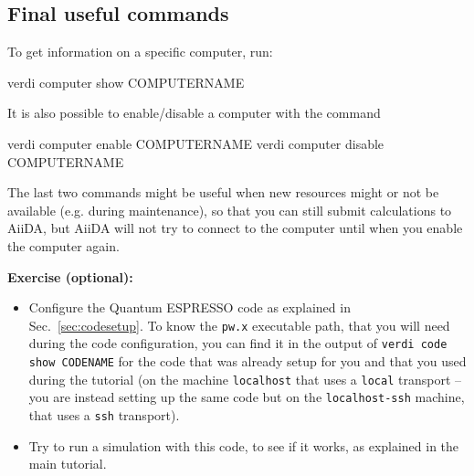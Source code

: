 \subsection{Final useful commands}
To get information on a specific computer, run:
\begin{bashcommand}
verdi computer show COMPUTERNAME
\end{bashcommand}

It is also possible to enable/disable a computer with the command
\begin{bashcommand}
verdi computer enable COMPUTERNAME
verdi computer disable COMPUTERNAME
\end{bashcommand}
The last two commands might be useful when new resources might
or not be available (e.g. during maintenance), 
so that you can still submit calculations to
AiiDA, but AiiDA will not try to connect to the computer until when
you enable the computer again.

\begin{tcolorbox}
\textbf{Exercise (optional):}
\begin{itemize}
\item Configure the Quantum ESPRESSO code as explained in Sec.~\ref{sec:codesetup}. 
To know the \texttt{pw.x} executable path, that you will need during the 
code configuration, you can find it in the output of \texttt{verdi code show CODENAME} for the code that was already setup for you and that you used during the tutorial (on the machine \texttt{localhost} that uses a \texttt{local} transport -- you are instead
setting up the same code but on the \texttt{localhost-ssh} machine, that uses a \texttt{ssh} transport).
\item Try to run a simulation with this code, to see if it works, as explained in the main tutorial.
\end{itemize}
\end{tcolorbox}





